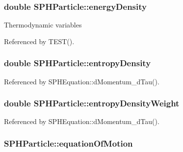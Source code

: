 \subsubsection[{energy\+Density}]{\setlength{\rightskip}{0pt plus 5cm}double S\+P\+H\+Particle\+::energy\+Density}\label{classSPHParticle_a06b72d633eedc682138618492aa6b5e4}
Thermodynamic variables 

Referenced by T\+E\+S\+T().

\hypertarget{classSPHParticle_a444f3b6a414b38d9bc0a59f129f3cc8c}{}
\subsubsection[{entropy\+Density}]{\setlength{\rightskip}{0pt plus 5cm}double S\+P\+H\+Particle\+::entropy\+Density}\label{classSPHParticle_a444f3b6a414b38d9bc0a59f129f3cc8c}


Referenced by S\+P\+H\+Equation\+::d\+Momentum\+\_\+d\+Tau().

\hypertarget{classSPHParticle_a6e6969476bac4b63b3b847cad236b2e3}{}
\subsubsection[{entropy\+Density\+Weight}]{\setlength{\rightskip}{0pt plus 5cm}double S\+P\+H\+Particle\+::entropy\+Density\+Weight}\label{classSPHParticle_a6e6969476bac4b63b3b847cad236b2e3}


Referenced by S\+P\+H\+Equation\+::d\+Momentum\+\_\+d\+Tau().

\hypertarget{classSPHParticle_aebfaab8941bb19c441582ab044ba66e3}{}
\subsubsection[{equation\+Of\+Motion}]{ S\+P\+H\+Particle\+::equation\+Of\+Motion}\label{classSPHParticle_aebfaab8941bb19c441582ab044ba66e3}
\hypertarget{classSPHParticle_a90fd1fe036c3819fb2afdd5f92fbf940}{}
